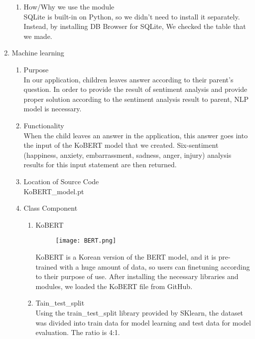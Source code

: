 \documentclass[conference]{IEEEtran}
\begin{document}
\begin{enumerate}
\begin{enumerate}
            \item How/Why we use the module
            \\SQLite is built-in on Python, so we didn’t need to install it separately. Instead, by installing DB Browser for SQLite, We checked the table that we made.
            
        \end{enumerate}
        
    \item Machine learning
        \begin{enumerate}
            \item Purpose
            \\In our application, children leaves answer according to their parent’s question. In order to provide the result of sentiment analysis and provide proper solution according to the sentiment analysis result to parent, NLP model is necessary.
            
            \item Functionality
            \\When the child leaves an answer in the application, this answer goes into the input of the KoBERT model that we created. Six-sentiment (happiness, anxiety, embarrassment, sadness, anger, injury) analysis results for this input statement are then returned.
            
            \item Location of Source Code
            \\KoBERT\_model.pt
            \newpage
            \item Class Component
            \begin{enumerate}
                \item KoBERT
                \begin{figure}[H]
                 \centering
                 \texttt{[image: BERT.png]}
                 \end{figure}
                KoBERT is a Korean version of the BERT model, and it is pre-trained with a huge amount of data, so users can finetuning according to their purpose of use. After installing the necessary libraries and modules, we loaded the KoBERT file from GitHub.
                
                
                \item Tain\_test\_split
                \\Using the train\_test\_split library provided by SKlearn, the dataset was divided into train data for model learning and test data for model evaluation. The ratio is 4:1.
                

\end{enumerate}
\end{enumerate}
\end{enumerate}
\end{document}

